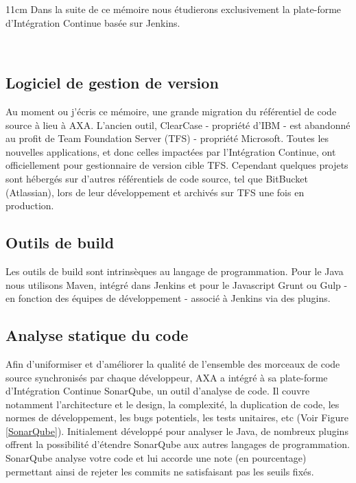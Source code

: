     \begin {boxedminipage} {11cm}
      Dans la suite de ce mémoire nous étudierons exclusivement la plate-forme d'Intégration Continue basée sur Jenkins.
    \end {boxedminipage}\\

    \subsection{Logiciel de gestion de version}
    Au moment ou j'écris ce mémoire, une grande migration du référentiel de code source à lieu à AXA. L'ancien outil, ClearCase - propriété d'IBM - est abandonné au profit de Team Foundation Server (TFS) - propriété Microsoft. Toutes les nouvelles applications, et donc celles impactées par l'Intégration Continue, ont officiellement pour gestionnaire de version cible TFS. Cependant quelques projets sont hébergés sur d'autres référentiels de code source, tel que BitBucket (Atlassian), lors de leur développement et archivés sur TFS une fois en production.

    \subsection{Outils de build}
    Les outils de build sont intrinsèques au langage de programmation. Pour le Java nous utilisons Maven, intégré dans Jenkins et pour le Javascript Grunt ou Gulp - en fonction des équipes de développement - associé à Jenkins via des plugins.

    \subsection{Analyse statique du code}
    Afin d'uniformiser et d'améliorer la qualité de l'ensemble des morceaux de code source synchronisés par chaque développeur, AXA a intégré à sa plate-forme d'Intégration Continue SonarQube, un outil d'analyse de code. Il couvre notamment l'architecture et le design, la complexité, la duplication de code, les normes de développement, les bugs potentiels, les tests unitaires, etc (Voir Figure \ref{SonarQube}). Initialement développé pour analyser le Java, de nombreux plugins offrent la possibilité d'étendre SonarQube aux autres langages de programmation. SonarQube analyse votre code et lui accorde une note (en pourcentage) permettant ainsi de rejeter les commits ne satisfaisant pas les seuils fixés.\\

